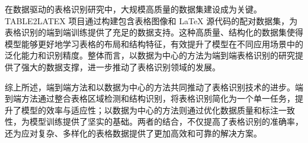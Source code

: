 \documentclass[UTF8,12pt, AutoFakeBold,fontset = founder]{ctexart}
\begin{document}
在数据驱动的表格识别研究中，大规模高质量的数据集建设成为关键。TABLE2LATEX 项目通过构建包含表格图像和 LaTeX 源代码的配对数据集，为表格识别的端到端训练提供了充足的数据支持。这种高质量、结构化的数据集使得模型能够更好地学习表格的布局和结构特征，有效提升了模型在不同应用场景中的泛化能力和识别精度。整体而言，以数据为中心的方法为端到端表格识别的研究提供了强大的数据支撑，进一步推动了表格识别领域的发展。

综上所述，端到端方法和以数据为中心的方法共同推动了表格识别技术的进步。端到端方法通过整合表格区域检测和结构识别，将表格识别简化为一个单一任务，提升了模型的效率与适应性；以数据为中心的方法则通过优化数据质量和标注一致性，为模型训练提供了坚实的基础。两者的结合，不仅提高了表格识别的准确率，还为应对复杂、多样化的表格数据提供了更加高效和可靠的解决方案。


\end{document}
